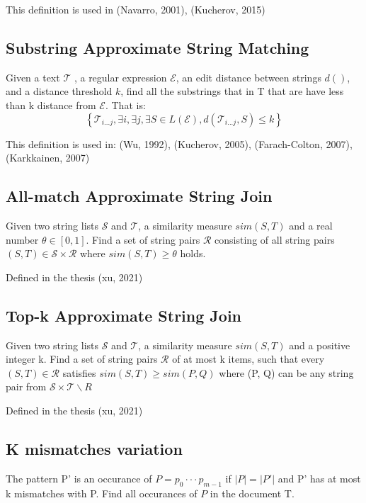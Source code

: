 \documentclass{article}
\newcommand{\set}[1]{\left\{#1\right\}}
\begin{document}
This definition is used in (Navarro, 2001), (Kucherov, 2015)

\subsection{Substring Approximate String Matching}

Given a text $\mathcal{T}$ , a regular expression $\mathcal{E}$,
an edit distance between strings $d()$, and a distance threshold
$k$, find all the substrings that in T that are have less than k
distance from $\mathcal{E}$. That is:
\begin{equation*}
    \set{\mathcal{T}_{i...j}, \exists i, \exists j, \exists S \in L(\mathcal{E}), d(\mathcal{T}_{i...j} , S) \leq k}
\end{equation*}

This definition is used in: (Wu, 1992), (Kucherov, 2005), (Farach-Colton, 2007), (Karkkainen, 2007)

\subsection{All-match Approximate String Join}
Given two string lists $\mathcal{S}$ and $\mathcal{T}$, a similarity measure $sim(S, T)$ and a real number $\theta \in [0,1]$. Find a set of string pairs $\mathcal{R}$ consisting of all string pairs $(S, T) \in \mathcal{S} \times \mathcal{R}$ where $sim(S,T) \geq \theta$ holds.

Defined in the thesis (xu, 2021)

\subsection{Top-k Approximate String Join}

Given two string lists $\mathcal{S}$ and $\mathcal{T}$, a similarity measure $sim(S, T)$ and a positive integer k. Find a set of string pairs $\mathcal{R}$ of at most k items, such that every $(S,T) \in \mathcal{R}$ satisfies $sim(S,T) \geq sim(P, Q)$ where (P, Q) can be any string pair from $\mathcal{S} \times \mathcal{T} \backslash R$

Defined in the thesis (xu, 2021)

\subsection{K mismatches variation}
The pattern P' is an occurance of $P = p_0 \cdot \cdot\cdot p_{m-1}$ if $|P| = |P'|$ and P' has at most k mismatches with P. Find all occurances of $P$ in the document T.
\end{document}
